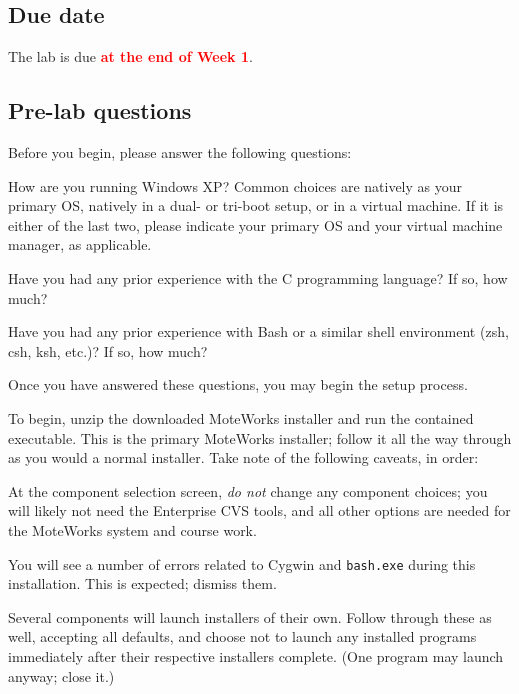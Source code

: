 \documentclass{article}
\newcommand{\labduedate}{at the end of Week 1}
\begin{document}
\subsection*{Due date}
The lab is due \textcolor{red}{\textbf{\labduedate}}.



\subsection*{Pre-lab questions}
Before you begin, please answer the following questions:

\begin{itemize*}
\item {} How are you running Windows XP? Common choices are natively as your primary OS, natively in a dual- or tri-boot setup, or in a virtual machine. If it is either of the last two, please indicate your primary OS and your virtual machine manager, as applicable. \\
\item {} Have you had any prior experience with the C programming language? If so, how much? \\
\item {} Have you had any prior experience with Bash or a similar shell environment (zsh, csh, ksh, etc.)? If so, how much?
\end{itemize*}

Once you have answered these questions, you may begin the setup process.


To begin, unzip the downloaded MoteWorks installer and run the contained executable. This is the primary MoteWorks installer; follow it all the way through as you would a normal installer. Take note of the following caveats, in order:

\begin{itemize*}
\item At the component selection screen, \textit{do not} change any component choices; you will likely not need the Enterprise CVS tools, and all other options are needed for the MoteWorks system and course work.
\item You will see a number of errors related to Cygwin and \verb!bash.exe! during this installation. This is expected; dismiss them.
\item Several components will launch installers of their own. Follow through these as well, accepting all defaults, and choose not to launch any installed programs immediately after their respective installers complete. (One program may launch anyway; close it.)
\end{itemize*}
\end{document}
